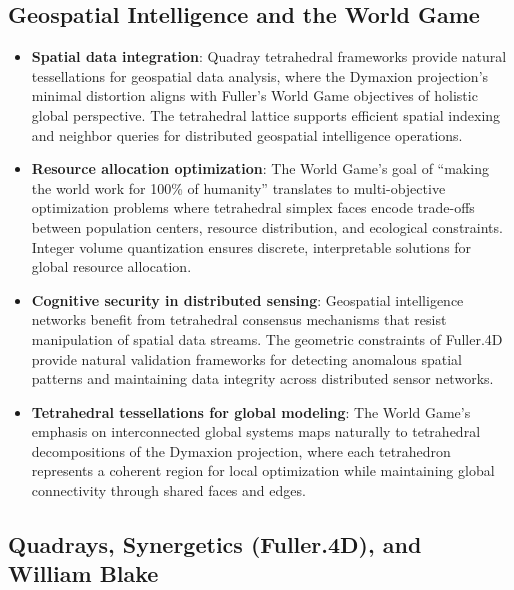 \documentclass[
  10pt,
]{article}
\providecommand{\tightlist}{%
  \setlength{\itemsep}{0pt}\setlength{\parskip}{0pt}}
\begin{document}
\subsection{Geospatial Intelligence and the World
Game}\label{geospatial-intelligence-and-the-world-game}

\begin{itemize}
\tightlist
\item
  \textbf{Spatial data integration}: Quadray tetrahedral frameworks
  provide natural tessellations for geospatial data analysis, where the
  Dymaxion projection's minimal distortion aligns with Fuller's World
  Game objectives of holistic global perspective. The tetrahedral
  lattice supports efficient spatial indexing and neighbor queries for
  distributed geospatial intelligence operations.
\item
  \textbf{Resource allocation optimization}: The World Game's goal of
  ``making the world work for 100\% of humanity'' translates to
  multi-objective optimization problems where tetrahedral simplex faces
  encode trade-offs between population centers, resource distribution,
  and ecological constraints. Integer volume quantization ensures
  discrete, interpretable solutions for global resource allocation.
\item
  \textbf{Cognitive security in distributed sensing}: Geospatial
  intelligence networks benefit from tetrahedral consensus mechanisms
  that resist manipulation of spatial data streams. The geometric
  constraints of Fuller.4D provide natural validation frameworks for
  detecting anomalous spatial patterns and maintaining data integrity
  across distributed sensor networks.
\item
  \textbf{Tetrahedral tessellations for global modeling}: The World
  Game's emphasis on interconnected global systems maps naturally to
  tetrahedral decompositions of the Dymaxion projection, where each
  tetrahedron represents a coherent region for local optimization while
  maintaining global connectivity through shared faces and edges.
\end{itemize}

\subsection{Quadrays, Synergetics (Fuller.4D), and William
Blake}\label{quadrays-synergetics-fuller.4d-and-william-blake}
\end{document}
